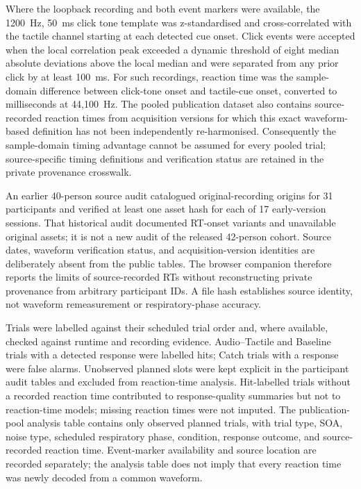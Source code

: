 Where the loopback recording and both event markers were available, the 1200~Hz, 50~ms click tone template was z-standardised and cross-correlated with the tactile channel starting at each detected cue onset. Click events were accepted when the local correlation peak exceeded a dynamic threshold of eight median absolute deviations above the local median and were separated from any prior click by at least 100~ms. For such recordings, reaction time was the sample-domain difference between click-tone onset and tactile-cue onset, converted to milliseconds at 44{,}100~Hz. The pooled publication dataset also contains source-recorded reaction times from acquisition versions for which this exact waveform-based definition has not been independently re-harmonised. Consequently the sample-domain timing advantage cannot be assumed for every pooled trial; source-specific timing definitions and verification status are retained in the private provenance crosswalk.

An earlier 40-person source audit catalogued original-recording origins for 31 participants and verified at least one asset hash for each of 17 early-version sessions. That historical audit documented RT-onset variants and unavailable original assets; it is not a new audit of the released 42-person cohort. Source dates, waveform verification status, and acquisition-version identities are deliberately absent from the public tables. The browser companion therefore reports the limits of source-recorded RTs without reconstructing private provenance from arbitrary participant IDs. A file hash establishes source identity, not waveform remeasurement or respiratory-phase accuracy.

Trials were labelled against their scheduled trial order and, where available, checked against runtime and recording evidence. Audio--Tactile and Baseline trials with a detected response were labelled hits; Catch trials with a response were false alarms. Unobserved planned slots were kept explicit in the participant audit tables and excluded from reaction-time analysis. Hit-labelled trials without a recorded reaction time contributed to response-quality summaries but not to reaction-time models; missing reaction times were not imputed. The publication-pool analysis table contains only observed planned trials, with trial type, SOA, noise type, scheduled respiratory phase, condition, response outcome, and source-recorded reaction time. Event-marker availability and source location are recorded separately; the analysis table does not imply that every reaction time was newly decoded from a common waveform.

